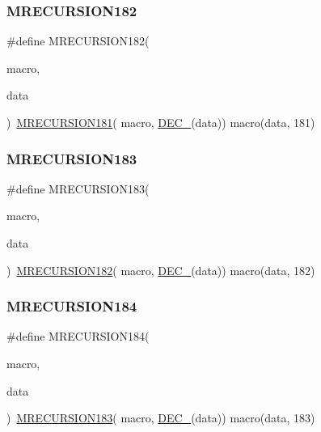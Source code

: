 \subsubsection{\texorpdfstring{MRECURSION182}{MRECURSION182}}
{\footnotesize\ttfamily \#define M\+R\+E\+C\+U\+R\+S\+I\+O\+N182(\begin{DoxyParamCaption}\item[{}]{macro,  }\item[{}]{data }\end{DoxyParamCaption})~\mbox{\hyperlink{group__group__sam0__utils__mrecursion_gad1cb96b447fac701830cdbdf69fd4f3d}{M\+R\+E\+C\+U\+R\+S\+I\+O\+N181}}(  macro, \mbox{\hyperlink{group__group__sam0__utils__mrecursion_ga1d23d683797679dca8c3512a54a5dcae}{D\+E\+C\+\_\+}}(data))   macro(data, 181)}

\mbox{\label{group__group__sam0__utils__mrecursion_gafe3e141260001214362a33542509fd0c}} 
\subsubsection{\texorpdfstring{MRECURSION183}{MRECURSION183}}
{\footnotesize\ttfamily \#define M\+R\+E\+C\+U\+R\+S\+I\+O\+N183(\begin{DoxyParamCaption}\item[{}]{macro,  }\item[{}]{data }\end{DoxyParamCaption})~\mbox{\hyperlink{group__group__sam0__utils__mrecursion_ga4bce301f66e1986fd89df43d3d7a6fd9}{M\+R\+E\+C\+U\+R\+S\+I\+O\+N182}}(  macro, \mbox{\hyperlink{group__group__sam0__utils__mrecursion_ga1d23d683797679dca8c3512a54a5dcae}{D\+E\+C\+\_\+}}(data))   macro(data, 182)}

\mbox{\label{group__group__sam0__utils__mrecursion_ga0fe22e5153970c4985a82aa915dfc9ce}} 
\subsubsection{\texorpdfstring{MRECURSION184}{MRECURSION184}}
{\footnotesize\ttfamily \#define M\+R\+E\+C\+U\+R\+S\+I\+O\+N184(\begin{DoxyParamCaption}\item[{}]{macro,  }\item[{}]{data }\end{DoxyParamCaption})~\mbox{\hyperlink{group__group__sam0__utils__mrecursion_gafe3e141260001214362a33542509fd0c}{M\+R\+E\+C\+U\+R\+S\+I\+O\+N183}}(  macro, \mbox{\hyperlink{group__group__sam0__utils__mrecursion_ga1d23d683797679dca8c3512a54a5dcae}{D\+E\+C\+\_\+}}(data))   macro(data, 183)}

